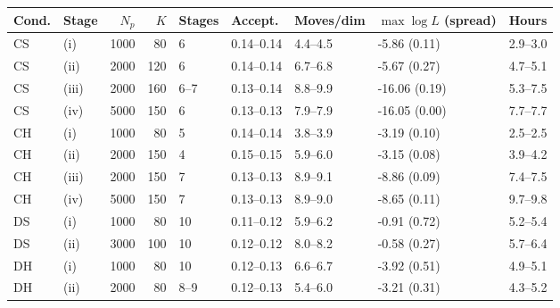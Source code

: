 \begin{tabular}{llrrlllll}\toprule
Cond. & Stage & $N_p$ & $K$ & Stages & Accept. & Moves/dim & $\max\log L$ (spread) & Hours\\
\midrule
CS & (i) & 1000 & 80 & 6 & 0.14--0.14 & 4.4--4.5 & -5.86 (0.11) & 2.9--3.0\\
CS & (ii) & 2000 & 120 & 6 & 0.14--0.14 & 6.7--6.8 & -5.67 (0.27) & 4.7--5.1\\
CS & (iii) & 2000 & 160 & 6--7 & 0.13--0.14 & 8.8--9.9 & -16.06 (0.19) & 5.3--7.5\\
CS & (iv) & 5000 & 150 & 6 & 0.13--0.13 & 7.9--7.9 & -16.05 (0.00) & 7.7--7.7\\
CH & (i) & 1000 & 80 & 5 & 0.14--0.14 & 3.8--3.9 & -3.19 (0.10) & 2.5--2.5\\
CH & (ii) & 2000 & 150 & 4 & 0.15--0.15 & 5.9--6.0 & -3.15 (0.08) & 3.9--4.2\\
CH & (iii) & 2000 & 150 & 7 & 0.13--0.13 & 8.9--9.1 & -8.86 (0.09) & 7.4--7.5\\
CH & (iv) & 5000 & 150 & 7 & 0.13--0.13 & 8.9--9.0 & -8.65 (0.11) & 9.7--9.8\\
DS & (i) & 1000 & 80 & 10 & 0.11--0.12 & 5.9--6.2 & -0.91 (0.72) & 5.2--5.4\\
DS & (ii) & 3000 & 100 & 10 & 0.12--0.12 & 8.0--8.2 & -0.58 (0.27) & 5.7--6.4\\
DH & (i) & 1000 & 80 & 10 & 0.12--0.13 & 6.6--6.7 & -3.92 (0.51) & 4.9--5.1\\
DH & (ii) & 2000 & 80 & 8--9 & 0.12--0.13 & 5.4--6.0 & -3.21 (0.31) & 4.3--5.2\\
\bottomrule\end{tabular}
